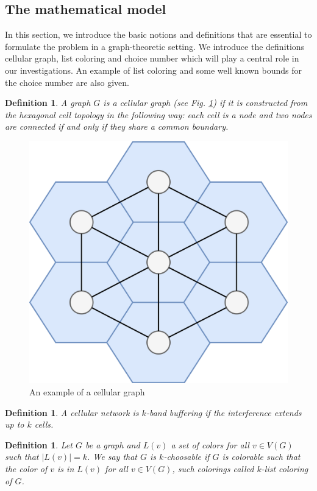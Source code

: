 \documentclass[a4paper, 12pt]{article}
\newtheorem{defin}[lem]{Definition}
\begin{document}
\subsection{The mathematical model}
In this section, we introduce the basic notions and definitions that are essential to formulate the problem in a graph-theoretic setting. We introduce the definitions cellular graph, list coloring and choice number which will play a central role in our investigations. An example of list coloring and some well known bounds for the choice number are also given.
\begin{defin} A graph $G$ is a  \textit{cellular graph} (see Fig. \ref{fig:cellular-graph}) if it is constructed from the hexagonal cell topology in the following way: each cell is a node and two nodes are connected if and only if they share a common boundary.
\end{defin}
\begin{figure}[!h]
\centering
\includegraphics[scale=0.15]{figures/cellular-graph.png}
\caption{An example of a cellular graph}\label{fig:cellular-graph}
\end{figure}
\begin{defin} A cellular network is $k$\textit{-band buffering} if the interference extends up to $k$ cells.
\end{defin}
\begin{defin} Let $G$ be a graph and $L(v)$ a set of colors for all $v \in V(G)$ such that $|L(v)|=k$. We say that $G$ is $k$\textit{-choosable} if $G$ is colorable such that the color of $v$ is in $L(v)$ for all $v \in V(G)$, such colorings called $k$\textit{-list coloring} of $G$.
\end{defin}
\end{document}

